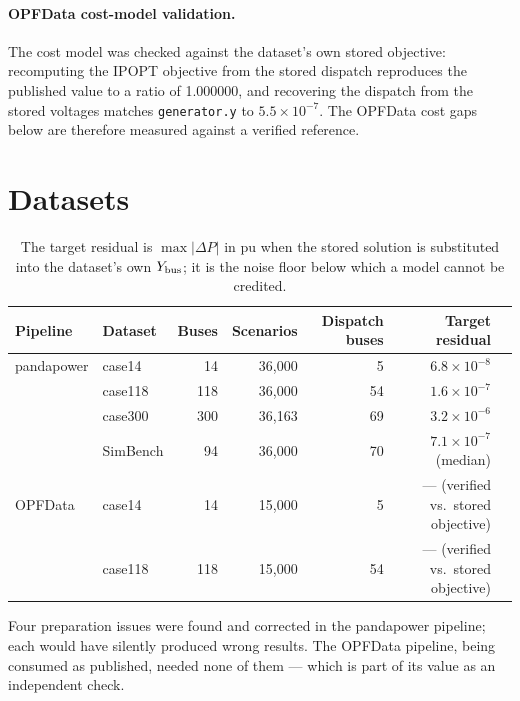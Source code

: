 \documentclass[10pt]{article}
\begin{document}
\paragraph{OPFData cost-model validation.} The cost model was checked against
the dataset's own stored objective: recomputing the IPOPT objective from the
stored dispatch reproduces the published value to a ratio of 1.000000, and
recovering the dispatch from the stored voltages matches
\texttt{generator.y} to \(5.5\times10^{-7}\). The OPFData cost gaps below are
therefore measured against a verified reference.

\section{Datasets}

\begin{table}[H]
\centering
\small
\begin{tabular}{llrrrrl}
\toprule
Pipeline & Dataset & Buses & Scenarios & Dispatch buses & Target residual \\
\midrule
pandapower & case14   &  14 & 36{,}000 &  5 & \(6.8\times10^{-8}\) \\
           & case118  & 118 & 36{,}000 & 54 & \(1.6\times10^{-7}\) \\
           & case300  & 300 & 36{,}163 & 69 & \(3.2\times10^{-6}\) \\
           & SimBench &  94 & 36{,}000 & 70 & \(7.1\times10^{-7}\) (median) \\
\midrule
OPFData    & case14   &  14 & 15{,}000 &  5 & --- (verified vs.\ stored objective) \\
           & case118  & 118 & 15{,}000 & 54 & --- (verified vs.\ stored objective) \\
\bottomrule
\end{tabular}
\caption{The target residual is \(\max|\Delta P|\) in pu when the stored solution
is substituted into the dataset's own \(Y_{\rm bus}\); it is the noise floor
below which a model cannot be credited.}
\end{table}

Four preparation issues were found and corrected in the pandapower pipeline;
each would have silently produced wrong results. The OPFData pipeline, being
consumed as published, needed none of them --- which is part of its value as an
independent check.
\end{document}
